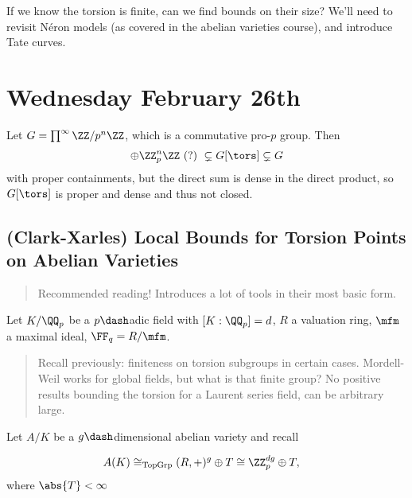 If we know the torsion is finite, can we find bounds on their size?
We'll need to revisit Néron models (as covered in the abelian varieties
course), and introduce Tate curves.

\hypertarget{wednesday-february-26th}{%
\section{Wednesday February 26th}\label{wednesday-february-26th}}

\begin{description}
\tightlist
\item[Example (regarding generalization from last time)]
Let \(G = \prod^\infty \ZZ/p^n\ZZ\), which is a commutative pro-\(p\)
group. Then
\begin{align*}\oplus \ZZ_p^n \ZZ ~(?)~\subsetneq G[\tors] \subsetneq G
  \end{align*} with proper containments, but the direct sum is dense in
the direct product, so \(G[\tors]\) is proper and dense and thus not
closed.
\end{description}

\hypertarget{clark-xarles-local-bounds-for-torsion-points-on-abelian-varieties}{%
\subsection{(Clark-Xarles) Local Bounds for Torsion Points on Abelian
Varieties}\label{clark-xarles-local-bounds-for-torsion-points-on-abelian-varieties}}

\begin{quote}
Recommended reading! Introduces a lot of tools in their most basic form.
\end{quote}

Let \(K/\QQ_p\) be a \(p\dash\)adic field with \([K: \QQ_p] = d\), \(R\)
a valuation ring, \(\mfm\) a maximal ideal, \(\FF_q = R/\mfm\).

\begin{quote}
Recall previously: finiteness on torsion subgroups in certain cases.
Mordell-Weil works for global fields, but what is that finite group? No
positive results bounding the torsion for a Laurent series field, can be
arbitrary large.
\end{quote}

Let \(A/K\) be a \(g\dash\)dimensional abelian variety and recall

\begin{align*}
A(K) &\cong_{\mathrm{TopGrp}} (R, +)^g \oplus T \cong \ZZ_p^{dg} \oplus T
,\end{align*} where \(\abs{T} < \infty\)

